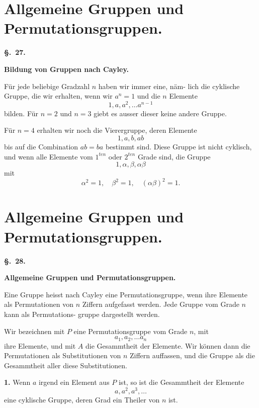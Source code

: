 \documentclass[12pt,a4paper]{article}
\begin{document}
\newpage
\section{Allgemeine Gruppen und Permutationsgruppen.}
\label{sec:27}

\begin{center}\textbf{\S.~27.}\end{center}
\begin{center}\large\bfseries Bildung von Gruppen nach Cayley.\end{center}

F\"ur jede beliebige Gradzahl $n$ haben wir immer eine, n\"am-
lich die cyklische Gruppe, die wir erhalten, wenn wir $a^n = 1$
und die $n$ Elemente
\[1, a, a^2, \ldots a^{n-1}\]
bilden. F\"ur $n = 2$ und $n = 3$ giebt es ausser dieser keine
andere Gruppe.

F\"ur $n = 4$ erhalten wir noch die Vierergruppe, deren
Elemente
\[1, a, b, ab\]
bis auf die Combination $ab = ba$ bestimmt sind. Diese Gruppe
ist nicht cyklisch, und wenn alle Elemente vom $1^{ten}$ oder $2^{ten}$ Grade sind, die Gruppe
\[1, \alpha, \beta, \alpha\beta\]
mit
\[\alpha^2 = 1,\quad \beta^2 = 1,\quad (\alpha\beta)^2 = 1.\]

\newpage
\section{Allgemeine Gruppen und Permutationsgruppen.}
\label{sec:28}

\begin{center}\textbf{\S.~28.}\end{center}
\begin{center}\large\bfseries Allgemeine Gruppen und Permutationsgruppen.\end{center}

Eine Gruppe heisst nach Cayley eine Permutationsgruppe,
wenn ihre Elemente als Permutationen von $n$ Ziffern aufgefasst
werden. Jede Gruppe vom Grade $n$ kann als Permutations-
gruppe dargestellt werden.

Wir bezeichnen mit $P$ eine Permutationsgruppe vom Grade
$n$, mit
\[a_1, a_2, \ldots a_n\]
ihre Elemente, und mit $A$ die Gesammtheit der Elemente.
Wir k\"onnen dann die Permutationen als Substitutionen von
$n$ Ziffern auffassen, und die Gruppe als die Gesammtheit aller
diese Substitutionen.

\medskip
\noindent\textbf{1.} Wenn $a$ irgend ein Element aus $P$ ist, so ist die
Gesammtheit der Elemente
\[a, a^2, a^3, \ldots\]
eine cyklische Gruppe, deren Grad ein Theiler von $n$ ist.
\end{document}
